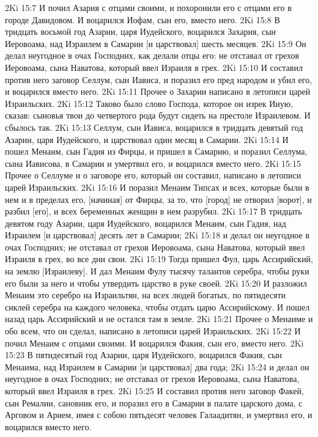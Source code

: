 2Ki 15:7  И почил Азария с отцами своими, и похоронили его с отцами его в городе Давидовом. И воцарился Иофам, сын его, вместо него.
2Ki 15:8  В тридцать восьмой год Азарии, царя Иудейского, воцарился Захария, сын Иеровоама, над Израилем в Самарии [и царствовал] шесть месяцев.
2Ki 15:9  Он делал неугодное в очах Господних, как делали отцы его: не отставал от грехов Иеровоама, сына Наватова, который ввел Израиля в грех.
2Ki 15:10  И составил против него заговор Селлум, сын Иависа, и поразил его пред народом и убил его, и воцарился вместо него.
2Ki 15:11  Прочее о Захарии написано в летописи царей Израильских.
2Ki 15:12  Таково было слово Господа, которое он изрек Ииую, сказав: сыновья твои до четвертого рода будут сидеть на престоле Израилевом. И сбылось так.
2Ki 15:13  Селлум, сын Иависа, воцарился в тридцать девятый год Азарии, царя Иудейского, и царствовал один месяц в Самарии.
2Ki 15:14  И пошел Менаим, сын Гадия из Фирцы, и пришел в Самарию, и поразил Селлума, сына Иависова, в Самарии и умертвил его, и воцарился вместо него.
2Ki 15:15  Прочее о Селлуме и о заговоре его, который он составил, написано в летописи царей Израильских.
2Ki 15:16  И поразил Менаим Типсах и всех, которые были в нем и в пределах его, [начиная] от Фирцы, за то, что [город] не отворил [ворот], и разбил [его], и всех беременных женщин в нем разрубил.
2Ki 15:17  В тридцать девятом году Азарии, царя Иудейского, воцарился Менаим, сын Гадия, над Израилем [и царствовал] десять лет в Самарии;
2Ki 15:18  и делал он неугодное в очах Господних; не отставал от грехов Иеровоама, сына Наватова, который ввел Израиля в грех, во все дни свои.
2Ki 15:19  Тогда пришел Фул, царь Ассирийский, на землю [Израилеву]. И дал Менаим Фулу тысячу талантов серебра, чтобы руки его были за него и чтобы утвердить царство в руке своей.
2Ki 15:20  И разложил Менаим это серебро на Израильтян, на всех людей богатых, по пятидесяти сиклей серебра на каждого человека, чтобы отдать царю Ассирийскому. И пошел назад царь Ассирийский и не остался там в земле.
2Ki 15:21  Прочее о Менаиме и обо всем, что он сделал, написано в летописи царей Израильских.
2Ki 15:22  И почил Менаим с отцами своими. И воцарился Факия, сын его, вместо него.
2Ki 15:23  В пятидесятый год Азарии, царя Иудейского, воцарился Факия, сын Менаима, над Израилем в Самарии [и царствовал] два года;
2Ki 15:24  и делал он неугодное в очах Господних; не отставал от грехов Иеровоама, сына Наватова, который ввел Израиля в грех.
2Ki 15:25  И составил против него заговор Факей, сын Ремалии, сановник его, и поразил его в Самарии в палате царского дома, с Арговом и Арием, имея с собою пятьдесят человек Галаадитян, и умертвил его, и воцарился вместо него.
